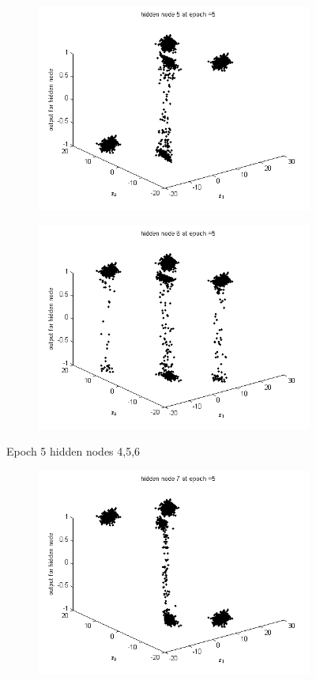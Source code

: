 \documentclass{article}
\begin{document}
\begin{flushleft}
\begin{figure}
\begin{subfigure}{.3\textwidth}
\end{subfigure}%
\begin{subfigure}{.3\textwidth}
  \centering
  \includegraphics[width=.8\linewidth]{Classification/linearlySeparable/h5_5}
  
\end{subfigure}
\begin{subfigure}{.3\textwidth}
  \centering
  \includegraphics[width=.8\linewidth]{Classification/linearlySeparable/h5_6}
  
\end{subfigure}
\caption{Epoch 5 hidden nodes 4,5,6}
\end{figure}

\begin{figure}
\begin{subfigure}{.3\textwidth}
  \centering
  \includegraphics[width=.8\linewidth]{Classification/linearlySeparable/h5_7}
 

\end{subfigure}
\end{figure}
\end{flushleft}
\end{document}
